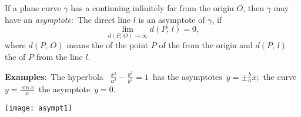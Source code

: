 \documentclass[12pt]{article}
\begin{document}
If a plane curve $\gamma$ has a  continuing infinitely far from the origin $O$, then $\gamma$ may have an {\em asymptote}: \,The direct line $l$ is an asymptote of $\gamma$, if 
  $$\lim_{d(P, \,O) \to \infty}d(P, \,l) = 0,$$
where $d(P, \,O)$ means the  of the point $P$ of the  from the origin and 
$d(P, \,l)$ the  of $P$ from the line $l$.

\textbf{Examples}:\, The hyperbola \, $\frac{x^2}{a^2}-\frac{y^2}{b^2} = 1$ \,has the asymptotes \,$y = \pm\frac{b}{a}x$;\, the curve \, $y = \frac{\sin x}{x}$\, the asymptote\, $y = 0$.
\begin{center}
\texttt{[image: asympt1]}
\end{center}
\end{document}

